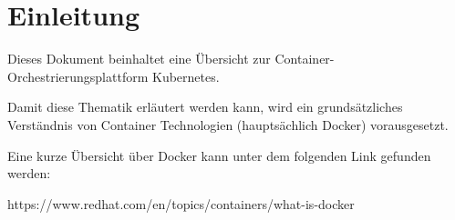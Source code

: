 \section{Einleitung}
Dieses Dokument beinhaltet eine Übersicht zur Container-Orchestrierungsplattform Kubernetes.

Damit diese Thematik erläutert werden kann, wird ein grundsätzliches Verständnis von Container Technologien (hauptsächlich Docker) vorausgesetzt.

Eine kurze Übersicht über Docker kann unter dem folgenden Link gefunden werden:  
 
https://www.redhat.com/en/topics/containers/what-is-docker
\clearpage